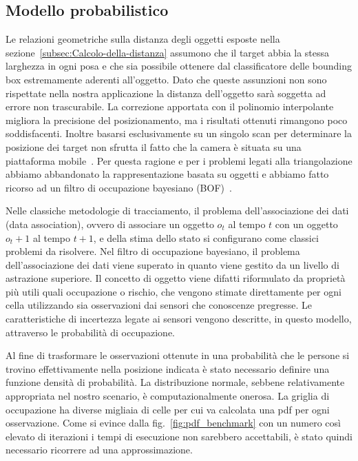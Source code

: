 \documentclass[a4paper]{article}
\begin{document}
	\newpage
	\subsection{Modello probabilistico}\label{subsec:Modello-probabilistico}
	Le relazioni geometriche sulla distanza degli oggetti esposte nella
	sezione~\ref{subsec:Calcolo-della-distanza} assumono che il target abbia la
	stessa larghezza in ogni posa e che sia possibile ottenere dal
	classificatore delle bounding box estremamente aderenti all'oggetto. Dato
	che queste assunzioni non sono rispettate nella nostra applicazione la
	distanza dell'oggetto sarà soggetta ad errore non trascurabile. La
	correzione apportata con il polinomio interpolante migliora la precisione
	del posizionamento, ma i risultati ottenuti rimangono poco soddisfacenti.
	Inoltre basarsi esclusivamente su un singolo scan per determinare la
	posizione dei target non sfrutta il fatto che la camera è situata su una
	piattaforma mobile~\cite{sunderhauf2018}. Per questa ragione e per i
	problemi legati alla triangolazione abbiamo abbandonato la rappresentazione
	basata su oggetti e abbiamo fatto ricorso ad un filtro di occupazione
	bayesiano (BOF)~\cite{tay2008bayesian}.

	Nelle classiche metodologie di tracciamento, il problema dell'associazione
	dei dati (data association), ovvero di associare un oggetto $o_t$ al tempo
	$t$ con un oggetto $o_t+1$ al tempo $t+1$, e della stima dello stato si
	configurano come classici problemi da risolvere. Nel filtro di occupazione
	bayesiano, il problema dell'associazione dei dati viene superato in quanto
	viene gestito da un livello di astrazione superiore. Il concetto di oggetto
	viene difatti riformulato da proprietà più utili quali occupazione o
	rischio, che vengono stimate direttamente per ogni cella utilizzando sia
	osservazioni dai sensori che conoscenze pregresse. Le caratteristiche di
	incertezza legate ai sensori vengono descritte, in questo modello,
	attraverso le probabilità di occupazione.

	Al fine di trasformare le osservazioni ottenute in una probabilità che le
	persone si trovino effettivamente nella posizione indicata è stato
	necessario definire una funzione densità di probabilità. La distribuzione
	normale, sebbene relativamente appropriata nel nostro scenario, è
	computazionalmente onerosa. La griglia di occupazione ha diverse migliaia
	di celle per cui va calcolata una pdf per ogni osservazione. Come si evince
	dalla fig.~\ref{fig:pdf_benchmark} con un numero così elevato di iterazioni
	i tempi di esecuzione non sarebbero accettabili, è stato quindi necessario
	ricorrere ad una approssimazione.
	
\end{document}
